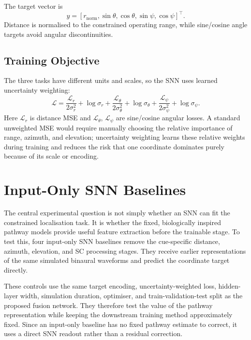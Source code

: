 The target vector is
\begin{equation}
    y=
    \left[
    r_{\mathrm{norm}},
    \sin\theta,
    \cos\theta,
    \sin\psi,
    \cos\psi
    \right]^{\top}.
\end{equation}
Distance is normalised to the constrained operating range, while sine/cosine angle targets avoid angular discontinuities.

\subsection{Training Objective}

The three tasks have different units and scales, so the SNN uses learned uncertainty weighting:
\begin{equation}
    \mathcal{L}
    =
    \frac{\mathcal{L}_r}{2\sigma_r^2}+\log\sigma_r
    +
    \frac{\mathcal{L}_{\theta}}{2\sigma_{\theta}^2}+\log\sigma_{\theta}
    +
    \frac{\mathcal{L}_{\psi}}{2\sigma_{\psi}^2}+\log\sigma_{\psi}.
\end{equation}
Here $\mathcal{L}_r$ is distance MSE and $\mathcal{L}_{\theta}$, $\mathcal{L}_{\psi}$ are sine/cosine angular losses. A standard unweighted MSE would require manually choosing the relative importance of range, azimuth, and elevation; uncertainty weighting learns these relative weights during training and reduces the risk that one coordinate dominates purely because of its scale or encoding.

\section{Input-Only SNN Baselines}

The central experimental question is not simply whether an SNN can fit the constrained localisation task. It is whether the fixed, biologically inspired pathway models provide useful feature extraction before the trainable stage. To test this, four input-only SNN baselines remove the cue-specific distance, azimuth, elevation, and SC processing stages. They receive earlier representations of the same simulated binaural waveforms and predict the coordinate target directly.

These controls use the same target encoding, uncertainty-weighted loss, hidden-layer width, simulation duration, optimiser, and train-validation-test split as the proposed fusion network. They therefore test the value of the pathway representation while keeping the downstream training method approximately fixed. Since an input-only baseline has no fixed pathway estimate to correct, it uses a direct SNN readout rather than a residual correction.

